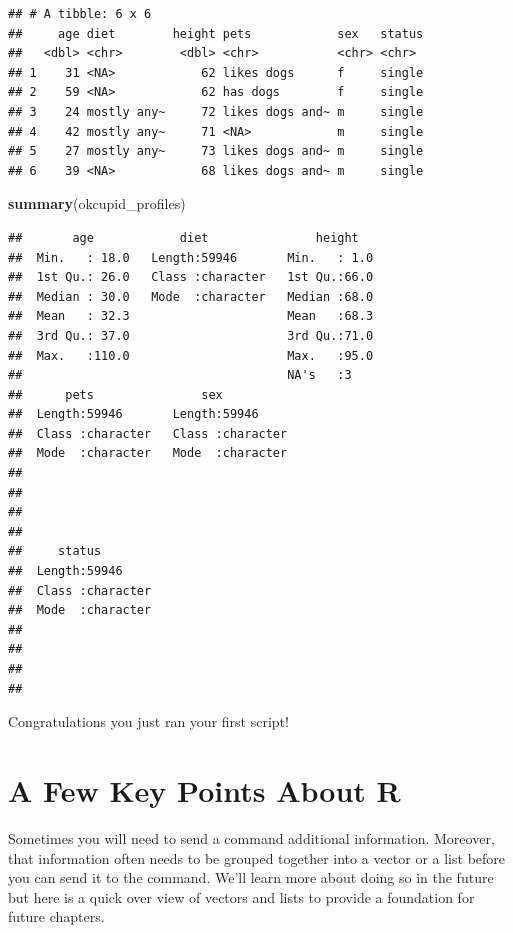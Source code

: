 \documentclass[
]{krantz}
\makeatletter
\newenvironment{Shaded}{\begin{snugshade}}{\end{snugshade}}
\newcommand{\KeywordTok}[1]{\textcolor[rgb]{0.27,0.27,0.27}{\textbf{#1}}}
\newcommand{\NormalTok}[1]{#1}
\newenvironment{kframe}{%
\medskip{}
\setlength{\fboxsep}{.8em}
 \def\at@end@of@kframe{}%
 \ifinner\ifhmode%
  \def\at@end@of@kframe{\end{minipage}}%
  \begin{minipage}{\columnwidth}%
 \fi\fi%
 \def\FrameCommand##1{\hskip\@totalleftmargin \hskip-\fboxsep
 \colorbox{shadecolor}{##1}\hskip-\fboxsep
     \hskip-\linewidth \hskip-\@totalleftmargin \hskip\columnwidth}%
 \MakeFramed {\advance\hsize-\width
   \@totalleftmargin\z@ \linewidth\hsize
   \@setminipage}}%
 {\par\unskip\endMakeFramed%
 \at@end@of@kframe}
\renewenvironment{Shaded}{\begin{kframe}}{\end{kframe}}
\makeatother
\begin{document}
\begin{verbatim}
## # A tibble: 6 x 6
##     age diet        height pets            sex   status
##   <dbl> <chr>        <dbl> <chr>           <chr> <chr> 
## 1    31 <NA>            62 likes dogs      f     single
## 2    59 <NA>            62 has dogs        f     single
## 3    24 mostly any~     72 likes dogs and~ m     single
## 4    42 mostly any~     71 <NA>            m     single
## 5    27 mostly any~     73 likes dogs and~ m     single
## 6    39 <NA>            68 likes dogs and~ m     single
\end{verbatim}

\begin{Shaded}
\begin{Highlighting}[]
\KeywordTok{summary}\NormalTok{(okcupid_profiles)}
\end{Highlighting}
\end{Shaded}

\begin{verbatim}
##       age            diet               height    
##  Min.   : 18.0   Length:59946       Min.   : 1.0  
##  1st Qu.: 26.0   Class :character   1st Qu.:66.0  
##  Median : 30.0   Mode  :character   Median :68.0  
##  Mean   : 32.3                      Mean   :68.3  
##  3rd Qu.: 37.0                      3rd Qu.:71.0  
##  Max.   :110.0                      Max.   :95.0  
##                                     NA's   :3     
##      pets               sex           
##  Length:59946       Length:59946      
##  Class :character   Class :character  
##  Mode  :character   Mode  :character  
##                                       
##                                       
##                                       
##                                       
##     status         
##  Length:59946      
##  Class :character  
##  Mode  :character  
##                    
##                    
##                    
## 
\end{verbatim}

Congratulations you just ran your first script!

\hypertarget{a-few-key-points-about-r}{%
\section{A Few Key Points About R}\label{a-few-key-points-about-r}}

Sometimes you will need to send a command additional information. Moreover, that information often needs to be grouped together into a vector or a list before you can send it to the command. We'll learn more about doing so in the future but here is a quick over view of vectors and lists to provide a foundation for future chapters.
\end{document}
